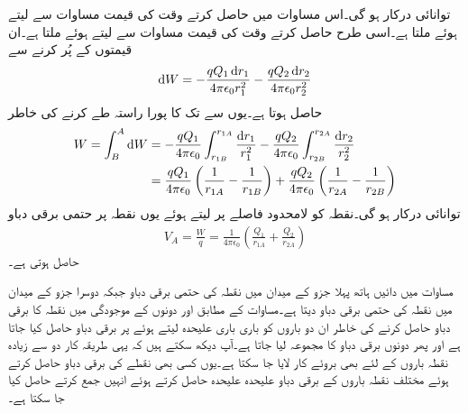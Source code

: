 توانائی درکار ہو گی۔اس مساوات میں  حاصل کرتے وقت  کی قیمت مساوات  سے لیتے ہوئے  ملتا ہے۔اسی طرح  حاصل کرتے وقت  کی قیمت مساوات  سے لیتے ہوئے  ملتا ہے۔ان قیمتوں کے پُر کرنے سے
\begin{align*}
\dif W=- \frac{q Q_1 \dif r_1}{4\pi \epsilon_0 r_1^2} - \frac{q Q_2 \dif r_2}{4\pi \epsilon_0 r_2^2} 
\end{align*}
حاصل ہوتا ہے۔یوں  سے  تک کا پورا راستہ طے کرنے کی خاطر
\begin{align*}
W=\int_B^A \dif W&=- \frac{q Q_1 }{4\pi \epsilon_0} \int_{r_{1B}}^{r_{1A}} \frac{\dif r_1}{r_1^2} -\frac{q Q_2 }{4\pi \epsilon_0} \int_{r_{2B}}^{r_{2A}} \frac{\dif r_2}{r_2^2}\\
&=\frac{q Q_1 }{4\pi \epsilon_0} \left(\frac{1}{r_{1A}}-\frac{1}{r_{1B}} \right)+\frac{q Q_2 }{4\pi \epsilon_0} \left(\frac{1}{r_{2A}}-\frac{1}{r_{2B}} \right)
\end{align*}
توانائی درکار ہو گی۔نقطہ  کو لامحدود فاصلے پر لیتے ہوئے یوں نقطہ  پر حتمی برقی دباو
\begin{align}\label{مساوات_توانائی_نقطہ_بار_کی_حتمی_دباو_پ}
V_A=\frac{W}{q}=\frac{1}{4\pi \epsilon_0} \left(\frac{Q_1}{r_{1A}}+\frac{Q_2}{r_{2A}} \right)
\end{align}
حاصل ہوتی ہے۔

مساوات  میں دائیں ہاتھ پہلا جزو  کے میدان میں نقطہ  کی حتمی برقی دباو جبکہ
 دوسرا جزو  کے میدان میں نقطہ  کی حتمی برقی دباو دیتا ہے۔مساوات    کے مطابق  اور  دونوں کے موجودگی میں نقطہ  کا برقی دباو حاصل کرنے کی خاطر ان دو باروں کو باری باری علیحدہ لیتے ہوئے  پر برقی دباو حاصل کیا جاتا ہے اور پھر دونوں برقی دباو کا مجموعہ لیا جاتا ہے۔آپ دیکھ سکتے ہیں کہ یہی طریقہ کار دو سے زیادہ نقطہ باروں کے لئے بھی بروئے کار لایا جا سکتا ہے۔یوں کسی بھی نقطے کی برقی دباو حاصل کرتے ہوئے مختلف نقطہ باروں کے برقی دباو علیحدہ علیحدہ حاصل کرتے ہوئے انہیں جمع کرتے حاصل کیا جا سکتا ہے۔

